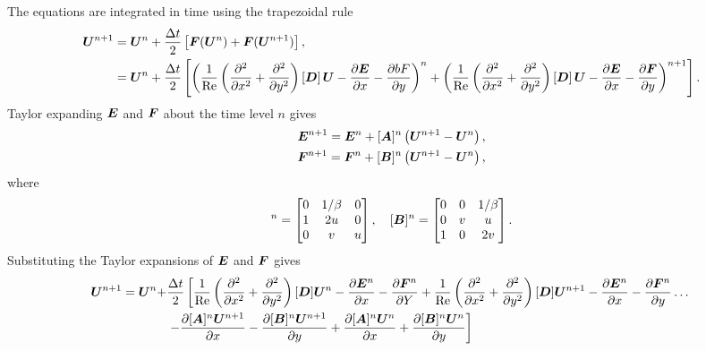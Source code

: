\documentclass[reqno]{amsart}
\begin{document}
    The equations are integrated in time using the trapezoidal rule
    \begin{align*}
        \bU^{n+1} &= \bU^n +
            \frac{\Delta t}{2}\left[
                \bm{F}(\bU^n) + \bm{F}(\bU^{n+1})
            \right], \\
                  &= \bU^n +
            \frac{\Delta t}{2}\left[
                \left(\frac{1}{\mathrm{Re}}\left(\pdifftwo{x} + \pdifftwo{y}\right)\left[\bD\right]\bU - \pdiff[\bE]{x} - \pdiff[bF]{y}\right)^n +
                \left(\frac{1}{\mathrm{Re}}\left(\pdifftwo{x} + \pdifftwo{y}\right)\left[\bD\right]\bU - \pdiff[\bE]{x} - \pdiff[\bF]{y}\right)^{n+1}
            \right].
    \end{align*}
    Taylor expanding $\bm{E}$ and $\bm{F}$ about the time level $n$ gives
    \begin{align*}
        \bm{E}^{n+1} = \bm{E}^n + [\bm{A}]^n\left(\bm{U}^{n+1} - \bm{U}^n\right), \\
        \bm{F}^{n+1} = \bm{F}^n + [\bm{B}]^n\left(\bm{U}^{n+1} - \bm{U}^n\right),
    \end{align*}
    where
    \begin{equation*}
        [\bA]^n = \begin{bmatrix} 0 & 1/\beta & 0 \\ 1 & 2u & 0 \\ 0 & v & u \end{bmatrix}, \quad
        [\bB]^n = \begin{bmatrix} 0 & 0 & 1/\beta \\ 0 & v & u \\ 1 & 0 & 2v \end{bmatrix}.
    \end{equation*}
    Substituting the Taylor expansions of $\bm{E}$ and $\bm{F}$ gives
    \begin{equation*}
        \begin{aligned}
            \bU^{n+1} = \bU^n + &\frac{\Delta t}{2}
        \left[
        \frac{1}{\mathrm{Re}}\left(\pdifftwo{x}  + \pdifftwo{y}\right)[\bD]\bU^n
        -\pdiff[\bE^n]{x} - \pdiff[\bF^n]{Y}
        + \frac{1}{\mathrm{Re}}\left(\pdifftwo{x} + \pdifftwo{y}\right)[\bD]\bU^{n+1}
        -\pdiff[\bE^n]{x} - \pdiff[\bF^n]{y} \dots
        \right. \\
        &\left.
        - \pdiff[[\bA]^n\bU^{n+1}]{x} - \pdiff[[\bB]^n\bU^{n+1}]{y}
        + \pdiff[[\bA]^n\bU^n]{x} + \pdiff[[\bB]^n\bU^n]{y}
        \right]
        \end{aligned}
    \end{equation*}
\end{document}
